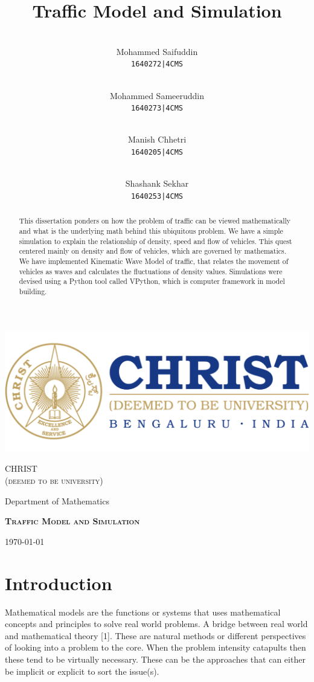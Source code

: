 \documentclass[12pt,a4paper]{report}
\author{
	\\Mohammed Saifuddin\\
	\texttt{1640272|4CMS}
	\and
	\\Mohammed Sameeruddin\\
	\texttt{1640273|4CMS}
	\and
	\\Manish Chhetri\\
	\texttt{1640205|4CMS}
	\and
	\\Shashank Sekhar\\
	\texttt{1640253|4CMS}
}
\title{\textbf{\huge{Traffic Model and Simulation}}}
\date{}
\begin{document}
	\begin{titlepage}
		\centering
		\includegraphics[width=1\textwidth]{logo.jpg} \par\vspace{1.5cm}
		{\scshape\huge CHRIST\\\large{(deemed to be university)} \par}
		\vspace{1cm}
		{\LARGE Department of Mathematics \par}
		\vspace{1.5cm}
		{\scshape\huge \textbf{Traffic Model and Simulation} \par}
		\vspace{2cm}
		\vfill
		{\large \today\par}
	\end{titlepage}
	
	\maketitle
	\tableofcontents
	
	\begin{abstract}
		This dissertation ponders on how the problem of traffic can be viewed mathematically and what is the underlying math behind this ubiquitous problem. We have a simple simulation to explain the relationship of density, speed and flow of vehicles. This quest centered mainly on density and flow of vehicles, which are governed by mathematics. We have implemented Kinematic Wave Model of traffic, that relates the movement of vehicles as waves and calculates the fluctuations of density values. Simulations were devised using a Python tool called VPython, which is computer framework in model building.
	\end{abstract}
	
	\section*{Introduction}
	Mathematical models are the functions or systems that uses mathematical concepts and principles to solve real world problems. A bridge between real world and mathematical theory [1]. These are natural methods or different perspectives of looking into a problem to the core. When the problem intensity catapults then these tend to be virtually necessary. These can be the approaches that can either be implicit or explicit to sort the issue(s).
\end{document}
